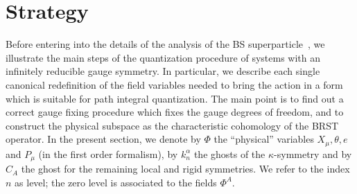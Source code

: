 \documentclass[a4paper,12pt]{article}
\begin{document}

\section{Strategy} 
\label{sec:strategy}

Before entering into the details of the analysis of the BS
superparticle~\cite{Brink-Schwarz}, we illustrate the main steps of
the quantization procedure of systems with an infinitely reducible gauge
symmetry. In particular, we describe each single canonical
redefinition of the field variables needed to bring the action in a
form which is suitable for path integral quantization. The main point
is to find out a correct gauge fixing procedure which fixes the gauge
degrees of freedom, and to construct the physical subspace as the
characteristic cohomology of the BRST operator.  In the present
section, we denote by $\Phi$ the ``physical'' variables
$X_\mu,\theta,e$ and $P_\mu$ (in the first order formalism), by
$k^\alpha_n$ the ghosts of the $\kappa$-symmetry and by $C_A$ the
ghost for the remaining local and rigid symmetries. We refer to the
index $n$ as level; the zero level is associated to the fields $\Phi^A$.
\end{document}

